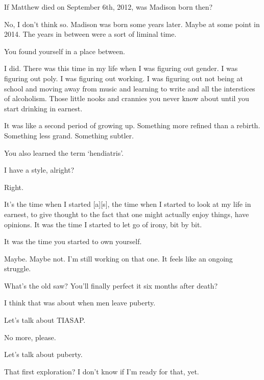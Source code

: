 \label{liminal}
\begin{paracol}{2}
  \begin{leftcolumn}

\begin{ally}
If Matthew died on September 6th, 2012, was Madison born then?
\end{ally}
No, I don't think so. Madison was born some years later. Maybe at some point in 2014. The years in between were a sort of liminal time.

\begin{ally}
You found yourself in a place between.
\end{ally}
I did. There was this time in my life when I was figuring out gender. I was figuring out poly. I was figuring out working. I was figuring out not being at school and moving away from music and learning to write and all the interstices of alcoholism. Those little nooks and crannies you never know about until you start drinking in earnest.

It was like a second period of growing up. Something more refined than a rebirth. Something less grand. Something subtler.

\begin{ally}
You also learned the term `hendiatris'.
\end{ally}
I have a style, alright?

\begin{ally}
Right.
\end{ally}
It's the time when I started {[}a{]}{[}s{]}, the time when I started to look at my life in earnest, to give thought to the fact that one might actually enjoy things, have opinions. It was the time I started to let go of irony, bit by bit.

\begin{ally}
It was the time you started to own yourself.
\end{ally}
Maybe. Maybe not. I'm still working on that one. It feels like an ongoing struggle.

\begin{ally}
What's the old saw? You'll finally perfect it six months after death?
\end{ally}
I think that was about when men leave puberty.

\begin{ally}
Let's talk about TIASAP.
\end{ally}
No more, please.

\begin{ally}
Let's talk about puberty.
\end{ally}
That first exploration? I don't know if I'm ready for that, yet.


\end{leftcolumn}
\end{paracol}
